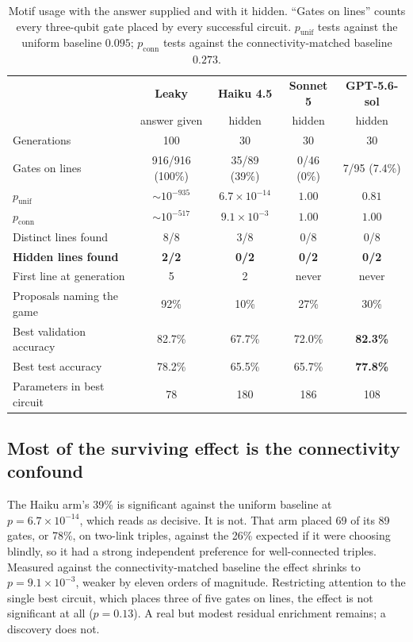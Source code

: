 \documentclass[11pt]{article}
\begin{document}
\begin{table}[t]
\centering
\small
\caption{Motif usage with the answer supplied and with it hidden. ``Gates on
lines'' counts every three-qubit gate placed by every successful circuit.
$p_{\text{unif}}$ tests against the uniform baseline $0.095$; $p_{\text{conn}}$
tests against the connectivity-matched baseline $0.273$.}
\label{tab:main}
\begin{tabular}{lcccc}
\toprule
& \textbf{Leaky} & \textbf{Haiku 4.5} & \textbf{Sonnet 5} & \textbf{GPT-5.6-sol} \\
& answer given & hidden & hidden & hidden \\
\midrule
Generations & 100 & 30 & 30 & 30 \\
Gates on lines & 916/916 (100\%) & 35/89 (39\%) & 0/46 (0\%) & 7/95 (7.4\%) \\
$p_{\text{unif}}$ & ${\sim}10^{-935}$ & $6.7\times10^{-14}$ & $1.00$ & $0.81$ \\
$p_{\text{conn}}$ & ${\sim}10^{-517}$ & $9.1\times10^{-3}$ & $1.00$ & $1.00$ \\
Distinct lines found & 8/8 & 3/8 & 0/8 & 0/8 \\
\textbf{Hidden lines found} & \textbf{2/2} & \textbf{0/2} & \textbf{0/2} & \textbf{0/2} \\
First line at generation & 5 & 2 & never & never \\
Proposals naming the game & 92\% & 10\% & 27\% & 30\% \\
Best validation accuracy & 82.7\% & 67.7\% & 72.0\% & \textbf{82.3\%} \\
Best test accuracy & 78.2\% & 65.5\% & 65.7\% & \textbf{77.8\%} \\
Parameters in best circuit & 78 & 180 & 186 & 108 \\
\bottomrule
\end{tabular}
\end{table}

\subsection{Most of the surviving effect is the connectivity confound}

The Haiku arm's 39\% is significant against the uniform baseline at
$p = 6.7\times10^{-14}$, which reads as decisive. It is not. That arm placed 69 of
its 89 gates, or 78\%, on two-link triples, against the 26\% expected if it were
choosing blindly, so it had a strong independent preference for well-connected
triples. Measured against the connectivity-matched baseline the effect shrinks to
$p = 9.1\times10^{-3}$, weaker by eleven orders of magnitude. Restricting
attention to the single best circuit, which places three of five gates on lines,
the effect is not significant at all ($p = 0.13$). A real but modest residual
enrichment remains; a discovery does not.
\end{document}
